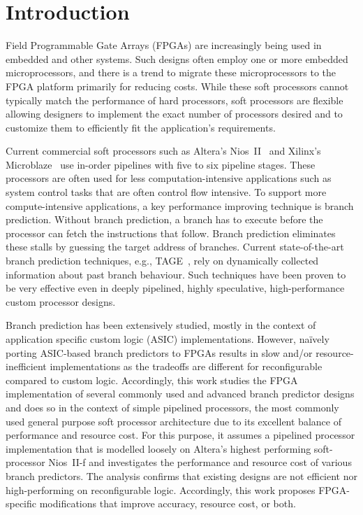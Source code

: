 \chapter{Introduction}
\label{chap:introduction}

Field Programmable Gate Arrays (FPGAs) are increasingly being used in embedded and other systems. Such designs often employ one or more embedded microprocessors, and there is a trend to migrate these microprocessors to the FPGA platform primarily for reducing costs. While these soft processors cannot typically match the performance of hard processors, soft processors are flexible allowing designers to implement the exact number of processors desired and to customize them to efficiently fit the application's requirements.

Current commercial soft processors such as Altera's Nios~II~\cite{niosii} and Xilinx's Microblaze~\cite{microblaze} use in-order pipelines with five to six pipeline stages. These processors are often used for less computation-intensive applications such as system control tasks that are often control flow intensive. To support more compute-intensive applications, a key performance improving technique is branch prediction. Without branch prediction, a branch has to execute before the processor can fetch the instructions that follow. Branch prediction eliminates these stalls by guessing the target address of branches. Current state-of-the-art branch prediction techniques, e.g., TAGE~\cite{tage}, rely on dynamically collected information about past branch behaviour. Such techniques have been proven to be very effective even in deeply pipelined, highly speculative, high-performance custom processor designs.

Branch prediction has been extensively studied, mostly in the context of application specific custom logic (ASIC) implementations. However, na\"ively porting ASIC-based branch predictors to FPGAs results in slow and/or resource-inefficient implementations as the tradeoffs are different for reconfigurable compared to custom logic. Accordingly, this work studies the FPGA implementation of several commonly used and advanced branch predictor designs and does so in the context of simple pipelined processors, the most commonly used general purpose soft processor architecture due to its excellent balance of performance and resource cost. For this purpose, it assumes a pipelined processor implementation that is modelled loosely on Altera's highest performing soft-processor Nios~II-f and investigates the performance and resource cost of various branch predictors. The analysis confirms that existing designs are not efficient nor high-performing on reconfigurable logic. Accordingly, this work proposes FPGA-specific modifications that improve accuracy, resource cost, or both.

